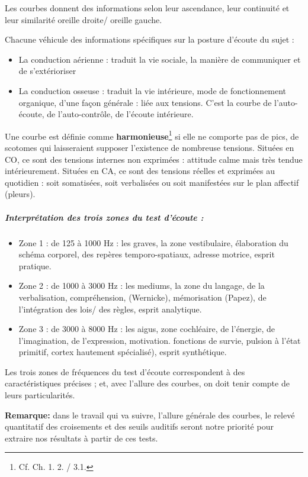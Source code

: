 Les courbes donnent des informations selon leur ascendance, leur
continuité et leur similarité oreille droite/ oreille gauche.

Chacune  véhicule des informations spécifiques
sur la posture d'écoute du sujet :
\begin{itemize}
\item La conduction aérienne : traduit la vie sociale, la manière de communiquer
et de s'extérioriser
\item La conduction osseuse : traduit la vie intérieure, mode de fonctionnement
organique, d'une façon générale : liée aux tensions. C'est la courbe
de l\textquoteright auto-écoute, de l\textquoteright auto-contrôle,
de l'écoute intérieure.
\end{itemize}

Une courbe est définie comme \textbf{harmonieuse}\footnote{Cf. Ch. 1. 2. / 3.1.}
si elle ne comporte pas de
pics, de scotomes
qui laisseraient
supposer l'existence de nombreuse tensions.
Situées en CO, ce sont des tensions internes non exprimées : attitude
calme mais très tendue intérieurement.
Situées en CA, ce sont des tensions réelles et exprimées au quotidien
: soit somatisées, soit verbalisées ou soit manifestées sur le plan
affectif (pleurs).

\subparagraph{Interprétation des trois zones du test d'écoute : }
\begin{itemize}
\item Zone 1 : de 125 à 1000 Hz : les graves, la zone vestibulaire, élaboration
du schéma corporel, des repères temporo-spatiaux, adresse motrice,
esprit pratique.
\item Zone 2 : de 1000 à 3000 Hz : les mediums, la zone du langage, de la
  verbalisation, compréhension, (Wernicke),
 mémorisation (Papez), de l'intégration des lois/
 des règles, esprit analytique.
\item Zone 3 : de 3000 à 8000 Hz : les aigus, zone cochléaire, de l'énergie,
  de l'imagination, de l'expression, motivation.
  fonctions de survie, pulsion à l'état primitif, cortex
 hautement spécialisé), esprit synthétique.
\end{itemize}

Les trois zones de fréquences du test d'écoute correspondent à des
caractéristiques précises ; et, avec l'allure des courbes, on doit
tenir compte de leurs particularités.


\textbf{Remarque:} dans le travail qui va suivre, l'allure générale des courbes, le relevé quantitatif des
  croisements et des seuils auditifs seront notre priorité pour
  extraire nos résultats à partir de ces tests.


